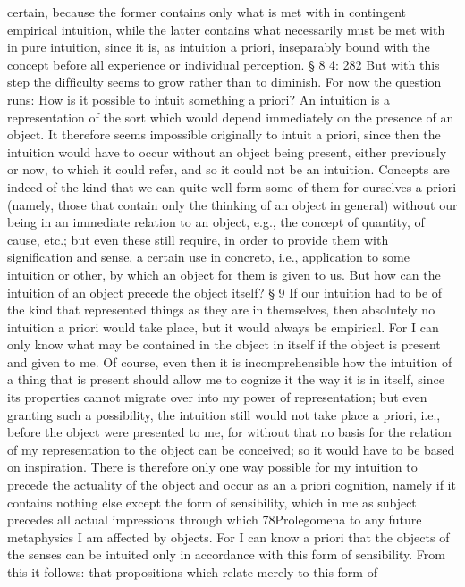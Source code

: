 certain, because the former contains only what is met with in contingent
empirical intuition, while the latter contains what necessarily must be
met with in pure intuition, since it is, as intuition a priori, inseparably
bound with the concept before all experience or individual perception.
§ 8
4: 282
But with this step the difﬁculty seems to grow rather than to diminish.
For now the question runs: How is it possible to intuit something a priori? An
intuition is a representation of the sort which would depend immediately
on the presence of an object. It therefore seems impossible originally to
intuit a priori, since then the intuition would have to occur without an
object being present, either previously or now, to which it could refer,
and so it could not be an intuition. Concepts are indeed of the kind that
we can quite well form some of them for ourselves a priori (namely, those
that contain only the thinking of an object in general) without our being
in an immediate relation to an object, e.g., the concept of quantity, of
cause, etc.; but even these still require, in order to provide them with
signiﬁcation and sense, a certain use in concreto, i.e., application to some
intuition or other, by which an object for them is given to us. But how
can the intuition of an object precede the object itself?
§ 9
If our intuition had to be of the kind that represented things as they are
in themselves, then absolutely no intuition a priori would take place, but it
would always be empirical. For I can only know what may be contained in
the object in itself if the object is present and given to me. Of course, even
then it is incomprehensible how the intuition of a thing that is present
should allow me to cognize it the way it is in itself, since its properties
cannot migrate over into my power of representation; but even granting
such a possibility, the intuition still would not take place a priori, i.e.,
before the object were presented to me, for without that no basis for
the relation of my representation to the object can be conceived; so it
would have to be based on inspiration. There is therefore only one way
possible for my intuition to precede the actuality of the object and occur
as an a priori cognition, namely if it contains nothing else except the form of
sensibility, which in me as subject precedes all actual impressions through which
78Prolegomena to any future metaphysics
I am affected by objects. For I can know a priori that the objects of the
senses can be intuited only in accordance with this form of sensibility.
From this it follows: that propositions which relate merely to this form of
